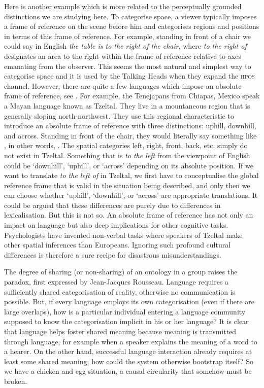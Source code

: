 Here is another example which is more related to 
the perceptually grounded distinctions we 
are studying here. To categorise space, a viewer 
typically imposes a frame of reference 
on the scene before him and categorises regions and positions in
terms of this frame of reference. For example, standing in front of
a chair we could say in English \textit{the table is to the right of the chair}, 
where \textit{to the right of} designates an area to the right
within the frame 
of reference relative to axes emanating from the observer. This 
seems the most natural and simplest way to categorise space
and it is used by the Talking Heads when they expand the 
\textsc{hpos} channel. However, there are quite a few languages
which impose an absolute frame of reference, see \cite{Levinson:2006}. 
For example, the Tenejapans from Chiapas, Mexico 
speak a Mayan language known as
Tzeltal. They live in a mountaneous region that is generally 
sloping north-northwest. They use this regional characteristic
to introduce an absolute frame of reference with three distinctions: 
uphill, downhill, and across. Standing in front of the chair, they 
would literally say something like
, in other words, 
. 
The spatial categories left, right, front, back, etc. simply 
do not exist in Tzeltal.
Something that is \textit{to the left} from the viewpoint
of English could be `downhill', `uphill', or `across' depending
on its absolute position. 
If we want to translate \textit{to the left of} 
in Tzeltal, we first have to conceptualise the global reference
frame that is valid in the situation being described,  
and only then we can choose whether `uphill', `downhill', or `across'   
are appropriate translations. It could be argued that 
these differences are purely due to differences in 
lexicalisation. But this is not so. 
An absolute frame of reference
has not only an impact on language but also deep implications
for other cognitive tasks. Psychologists have invented 
non-verbal tasks where speakers of Tzeltal make other spatial
inferences than Europeans. Ignoring such profound 
cultural differences is therefore a sure recipe for
disastrous misunderstandings.

The degree of sharing (or non-sharing) of an 
ontology in a group raises the paradox, first 
expressed by Jean-Jacques Rousseau. Language requires a
sufficiently shared categorisation of reality, otherwise 
no communication is possible. But, if every language 
employs its own 
categorisation (even if there are large overlaps), how is a
particular individual entering a language community supposed to
know the categorisation implicit in his or her
language? It is clear that language 
helps foster shared meaning because meaning is transmitted 
through language, for example when a speaker explains the meaning
of a word to a hearer. On the other hand, successful 
language interaction already requires at least some shared
meaning, how could the system otherwise bootstrap itself?
So we have a chicken and egg situation, a causal 
circularity that somehow must be broken. 

